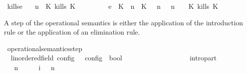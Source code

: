 \begin{isabellebody}
{\isacharbar}\ kills{\isacharunderscore}e{}{\isacharcolon}\isanewline
%
\isanewline
\ \ {\isacartoucheopen}{\isacharparenleft}{\isasymGamma}{\isacharcomma}\ n\ {\isasymturnstile}\ {\isacharparenleft}{\isacharparenleft}K\ kills\ K\ {\isacharhash}\ {\isasymPsi}{\isacharparenright}\ {\isasymtriangleright}\ {\isasymPhi}{\isacharparenright}\isanewline
\ \ \ \ \ {\isasymhookrightarrow}\isactrlsub e\ \ {\isacharparenleft}{\isacharparenleft}{\isacharparenleft}K\ {\isasymUp}\ n{\isacharparenright}\ {\isacharhash}\ {\isacharparenleft}K\ {\isasymnot}{\isasymUp}\ {\isasymge}\ n{\isacharparenright}\ {\isacharhash}\ {\isasymGamma}{\isacharparenright}{\isacharcomma}\ n\ {\isasymturnstile}\ {\isasymPsi}\ {\isasymtriangleright}\ {\isacharparenleft}{\isacharparenleft}K\ kills\ K\ {\isacharhash}\ {\isasymPhi}{\isacharparenright}{\isacharparenright}{\isacartoucheclose}%
\begin{isamarkuptext}%
A step of the operational semantics is either the application of the introduction 
  rule or the application of an elimination rule.%
\end{isamarkuptext}\isamarkuptrue%
\isamarkupfalse%
\ operational{\isacharunderscore}semantics{\isacharunderscore}step\isanewline
\ \ {\isacharcolon}{\isacharcolon}{\isacartoucheopen}{\isacharparenleft}{\isacharprime}{\isasymtau}{\isacharcolon}{\isacharcolon}linordered{\isacharunderscore}field{\isacharparenright}\ config\ {\isasymRightarrow}\ {\isacharprime}{\isasymtau}\ config\ {\isasymRightarrow}\ bool{\isacartoucheclose}\ \ \ \ \ \ \ \ \ \ \ \ \ \ {\isacharparenleft}{\isachardoublequoteopen}{\isacharunderscore}\ {\isasymhookrightarrow}\ {\isacharunderscore}{\isachardoublequoteclose}\ {}{}{\isacharparenright}\isanewline
{}\isanewline
\ \ intro{\isacharunderscore}part{\isacharcolon}\isanewline
\ \ {\isacartoucheopen}{\isacharparenleft}{\isasymGamma}\ n\ {\isasymturnstile}\ {\isasymPsi}\ {\isasymtriangleright}\ {\isasymPhi}\ \ {\isasymhookrightarrow}\isactrlsub i\ \ {\isacharparenleft}{\isasymGamma}\ n\ {\isasymturnstile}\ {\isasymPsi}\ {\isasymtriangleright}\ {\isasymPhi}\isanewline

\end{isabellebody}
